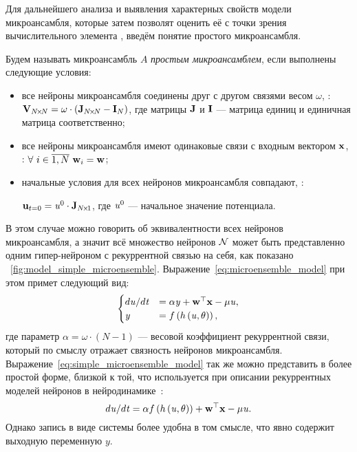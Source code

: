 Для дальнейшего анализа и выявления характерных свойств модели микроансамбля, которые затем позволят оценить её с точки зрения вычислительного элемента , введём понятие простого микроансамбля.
\begin{Definition}
    Будем называть микроансамбль $A$ \textit{простым микроансамблем}, если выполнены следующие условия:
    \begin{itemize}
        \item все нейроны микроансамбля соединены друг с другом связями весом $\omega$, \ie: $\mathrm{\mathbf{V}}_{N\!\times\!N} = \omega \cdot \left( \mathrm{\mathbf{J}}_{N\!\times\!N} - \mathrm{\mathbf{I}}_{N} \right)$, где матрицы $\mathrm{\mathbf{J}}$ и $\mathrm{\mathbf{I}}$  --- матрица единиц и единичная матрица соответственно;
        \item все нейроны микроансамбля имеют одинаковые связи с входным вектором $\mathrm{\mathbf{x}}$, \ie: $\forall\ i \in \overline{1,N}\ \mathrm{\mathbf{w}}_{i} = \mathrm{\mathbf{w}}$;
        \item начальные условия для всех нейронов микроансамбля совпадают, \ie: \par $\mathrm{\mathbf{u}}_{t=0} = \mathit{u}^{0} \cdot \mathrm{\mathbf{J}}_{N\!\times\!1}$, где $\mathit{u}^{0}$ --- начальное значение потенциала.
    \end{itemize}
\end{Definition}

В этом случае можно говорить об эквивалентности всех нейронов микроансамбля, а значит всё множество нейронов $\mathcal{N}$ может быть представленно одним гипер-нейроном с рекуррентной связью на себя, как показано \onfigure~\ref{fig:model_simple_microensemble}. Выражение~\eqref{eq:microensemble_model} при этом примет следующий вид:
\begin{equation}
    \label{eq:simple_microensemble_model}
    \begin{cases}
        d\mathit{u}/d\mathit{t} &= \alpha \mathit{y} + \mathrm{\mathbf{w}}^{\top} \mathrm{\mathbf{x}} - \mu \mathit{u}, \\
        \mathit{y}              &= f\left( h\left( \mathit{u}, \theta \right) \right), \\
    \end{cases}
\end{equation}
где параметр $\alpha = \omega \cdot \left( N - 1 \right)$ --- весовой коэффициент рекуррентной связи, который по смыслу отражает связность нейронов микроансамбля. Выражение~\eqref{eq:simple_microensemble_model} так же можно представить в более простой форме, близкой к той, что используется при описании рекуррентных моделей нейронов в нейродинамике~\cite{Haykin2008}:
\begin{equation}
    \label{eq:simple_microensemble_model_plain}
    d\mathit{u}/d\mathit{t} = \alpha f\left( h\left( \mathit{u}, \theta \right) \right) + \mathrm{\mathbf{w}}^{\top} \mathrm{\mathbf{x}} - \mu \mathit{u}.
\end{equation}
Однако запись в виде системы более удобна в том смысле, что явно содержит выходную переменную $y$.

